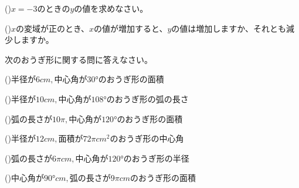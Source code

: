 \documentclass[
  12pt,a4paper,lualatex,ja=standard]{bxjsarticle}
\begin{document}
\begin{flushleft}
()\hspace{2.5pt}$x = -3$のときの$y$の値を求めなさい。

\vspace{10mm}

()\hspace{2.5pt}$x$の変域が正のとき、$x$の値が増加すると、$y$の値は増加しますか、それとも減少しますか。

\vfill

\newpage

\setcounter{skaunta}{0}
\noindent{} \hspace{1pt}次のおうぎ形に関する問に答えなさい。

()\hspace{2.5pt}半径が$6\si{cm},$中心角が$\ang{30}$のおうぎ形の面積

\vspace{20mm}

()\hspace{2.5pt}半径が$10\si{cm},$中心角が$\ang{108}$のおうぎ形の弧の長さ

\vspace{20mm}

()\hspace{2.5pt}弧の長さが$10 \pi,$中心角が$\ang{120}$のおうぎ形の面積

\vspace{20mm}

()\hspace{2.5pt}半径が$12\si{cm},$面積が$72 \pi \si{cm}^2$のおうぎ形の中心角

\vspace{20mm}

()\hspace{2.5pt}弧の長さが$6 \pi \si{cm}, $中心角が$\ang{120}$のおうぎ形の半径

\vspace{20mm}

()\hspace{2.5pt}中心角が$\ang{90} \si{cm},$弧の長さが$9 \pi \si{cm}$のおうぎ形の面積

\vspace{20mm}


\end{flushleft}
\end{document}
